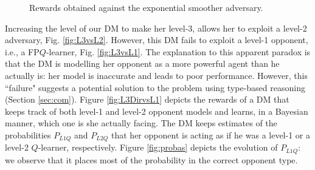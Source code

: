 \begin{figure}

  
  \caption{Rewards obtained against the exponential smoother adversary. }
\end{figure}

Increasing the level of our DM to make her level-3, allows her to exploit a level-2 adversary, Fig. \ref{fig:L3vsL2}. However, this DM fails to exploit a level-1 opponent, i.e., a FP$Q$-learner, Fig. \ref{fig:L3vsL1}. The explanation to this apparent paradox is that the DM is modelling her opponent as a more powerful agent
than he actually is: her model is inaccurate and leads to poor performance.
However, this ``failure" suggests a potential solution to the problem
using type-based reasoning (Section \ref{sec:com}). Figure \ref{fig:L3DirvsL1} depicts the rewards of a DM that keeps track of both level-1 and level-2 opponent models and learns, in a Bayesian manner, which one is she 
actually facing. The DM keeps estimates of the probabilities $P_{L1Q}$ and $P_{L2Q}$ that her opponent is acting as if he was a level-1 or a level-2 $Q$-learner, respectively. Figure \ref{fig:probas} depicts the evolution of $P_{L1Q}$: we observe that it places most of the probability in the correct opponent type. 





